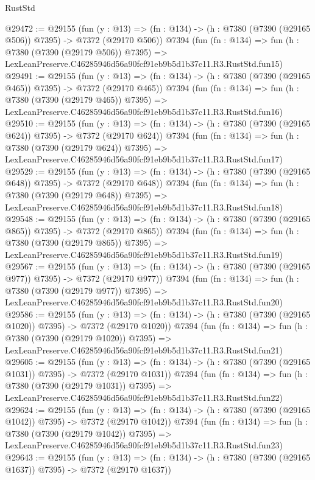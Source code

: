 \begin{lexlean}{RustStd}
\begin{coremodule}
@29472 := @29155
    (fun (y : @13) => (fn : @134) -> (h : @7380 (@7390 (@29165 @506)) @7395) -> @7372 (@29170 @506))
    @7394
    (fun (fn : @134) =>
    fun (h : @7380 (@7390 (@29179 @506)) @7395) =>
    LexLeanPreserve.C46285946d56a90fcf91eb9b5d1b37c11.R3.RustStd.fun15)
@29491 := @29155
    (fun (y : @13) => (fn : @134) -> (h : @7380 (@7390 (@29165 @465)) @7395) -> @7372 (@29170 @465))
    @7394
    (fun (fn : @134) =>
    fun (h : @7380 (@7390 (@29179 @465)) @7395) =>
    LexLeanPreserve.C46285946d56a90fcf91eb9b5d1b37c11.R3.RustStd.fun16)
@29510 := @29155
    (fun (y : @13) => (fn : @134) -> (h : @7380 (@7390 (@29165 @624)) @7395) -> @7372 (@29170 @624))
    @7394
    (fun (fn : @134) =>
    fun (h : @7380 (@7390 (@29179 @624)) @7395) =>
    LexLeanPreserve.C46285946d56a90fcf91eb9b5d1b37c11.R3.RustStd.fun17)
@29529 := @29155
    (fun (y : @13) => (fn : @134) -> (h : @7380 (@7390 (@29165 @648)) @7395) -> @7372 (@29170 @648))
    @7394
    (fun (fn : @134) =>
    fun (h : @7380 (@7390 (@29179 @648)) @7395) =>
    LexLeanPreserve.C46285946d56a90fcf91eb9b5d1b37c11.R3.RustStd.fun18)
@29548 := @29155
    (fun (y : @13) => (fn : @134) -> (h : @7380 (@7390 (@29165 @865)) @7395) -> @7372 (@29170 @865))
    @7394
    (fun (fn : @134) =>
    fun (h : @7380 (@7390 (@29179 @865)) @7395) =>
    LexLeanPreserve.C46285946d56a90fcf91eb9b5d1b37c11.R3.RustStd.fun19)
@29567 := @29155
    (fun (y : @13) => (fn : @134) -> (h : @7380 (@7390 (@29165 @977)) @7395) -> @7372 (@29170 @977))
    @7394
    (fun (fn : @134) =>
    fun (h : @7380 (@7390 (@29179 @977)) @7395) =>
    LexLeanPreserve.C46285946d56a90fcf91eb9b5d1b37c11.R3.RustStd.fun20)
@29586 := @29155
    (fun (y : @13) =>
    (fn : @134) -> (h : @7380 (@7390 (@29165 @1020)) @7395) -> @7372 (@29170 @1020))
    @7394
    (fun (fn : @134) =>
    fun (h : @7380 (@7390 (@29179 @1020)) @7395) =>
    LexLeanPreserve.C46285946d56a90fcf91eb9b5d1b37c11.R3.RustStd.fun21)
@29605 := @29155
    (fun (y : @13) =>
    (fn : @134) -> (h : @7380 (@7390 (@29165 @1031)) @7395) -> @7372 (@29170 @1031))
    @7394
    (fun (fn : @134) =>
    fun (h : @7380 (@7390 (@29179 @1031)) @7395) =>
    LexLeanPreserve.C46285946d56a90fcf91eb9b5d1b37c11.R3.RustStd.fun22)
@29624 := @29155
    (fun (y : @13) =>
    (fn : @134) -> (h : @7380 (@7390 (@29165 @1042)) @7395) -> @7372 (@29170 @1042))
    @7394
    (fun (fn : @134) =>
    fun (h : @7380 (@7390 (@29179 @1042)) @7395) =>
    LexLeanPreserve.C46285946d56a90fcf91eb9b5d1b37c11.R3.RustStd.fun23)
@29643 := @29155
    (fun (y : @13) =>
    (fn : @134) -> (h : @7380 (@7390 (@29165 @1637)) @7395) -> @7372 (@29170 @1637))

\end{coremodule}
\end{lexlean}
